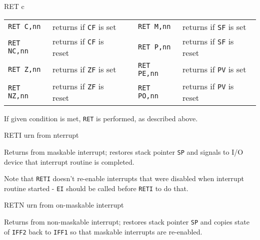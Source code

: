 \documentclass[12pt,twoside,openright,a4paper]{book}
\begin{document}
\begin{basedescript}{
	\desclabelstyle{\multilinelabel}
	\desclabelwidth{3cm}}
\begin{DetailItem}{RET c}
		\vspace{1ex} %
		\begin{tabular}{@{}llcll}
			{\tt RET C,nn} & returns if {\tt CF} is set & & 
				{\tt RET M,nn} & returns if {\tt SF} is set\\
			{\tt RET NC,nn} & returns if {\tt CF} is reset & & 
				{\tt RET P,nn} & returns if {\tt SF} is reset\\
			{\tt RET Z,nn} & returns if {\tt ZF} is set & & 
				{\tt RET PE,nn} & returns if {\tt PV} is set\\
			{\tt RET NZ,nn} & returns if {\tt ZF} is reset & & 
				{\tt RET PO,nn} & returns if {\tt PV} is reset\\
		\end{tabular}

		If given condition is met, {\tt RET} is performed, as described above.

		\DetailNoEffect
						
		\begin{DetailTiming}
		\end{DetailTiming}

	\end{DetailItem}

	\begin{DetailItem}{RETI}
		{urn from nterrupt}
		{\SymRETI}

		Returns from maskable interrupt; restores stack pointer {\tt SP} and signals to I/O device that interrupt routine is completed.
		
		Note that {\tt RETI} doesn't re-enable interrupts that were disabled when interrupt routine started - {\tt EI} should be called before {\tt RETI} to do that.

		\DetailNoEffect
				
		\begin{DetailTiming}
			\DetailTime{}{4}{14}
		\end{DetailTiming}

	\end{DetailItem}

	\begin{DetailItem}{RETN}
		{urn from on-maskable interrupt}
		{\SymRETN}

		Returns from non-maskable interrupt; restores stack pointer {\tt SP} and copies state of {\tt IFF2} back to {\tt IFF1} so that maskable interrupts are re-enabled.


\end{DetailItem}
\end{basedescript}
\end{document}
